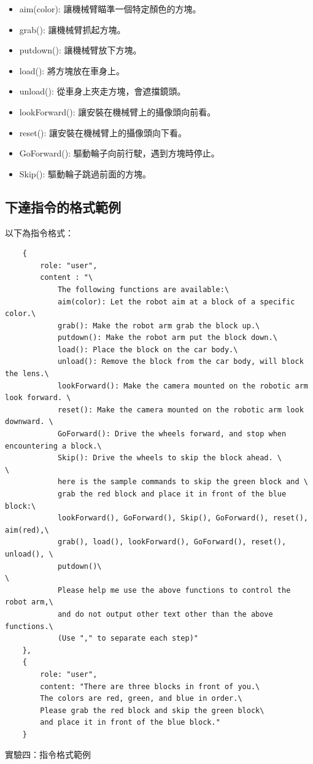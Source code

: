\documentclass[class=NCU_thesis, crop=false]{standalone}
\begin{document}
\begin{itemize}
    \item aim(color): 讓機械臂瞄準一個特定顏色的方塊。
    \item grab(): 讓機械臂抓起方塊。
    \item putdown(): 讓機械臂放下方塊。
    \item load(): 將方塊放在車身上。
    \item unload(): 從車身上夾走方塊，會遮擋鏡頭。
    \item lookForward(): 讓安裝在機械臂上的攝像頭向前看。
    \item reset(): 讓安裝在機械臂上的攝像頭向下看。

    \item GoForward(): 驅動輪子向前行駛，遇到方塊時停止。
    \item Skip(): 驅動輪子跳過前面的方塊。 
\end{itemize}

\newpage
\subsection{下達指令的格式範例}
以下為指令格式：
\begin{listing}[h]
    \begin{verbatim}
    {     
        role: "user",
        content : "\
            The following functions are available:\
            aim(color): Let the robot aim at a block of a specific color.\
            grab(): Make the robot arm grab the block up.\
            putdown(): Make the robot arm put the block down.\
            load(): Place the block on the car body.\
            unload(): Remove the block from the car body, will block the lens.\
            lookForward(): Make the camera mounted on the robotic arm look forward. \
            reset(): Make the camera mounted on the robotic arm look downward. \
            GoForward(): Drive the wheels forward, and stop when encountering a block.\
            Skip(): Drive the wheels to skip the block ahead. \
\
            here is the sample commands to skip the green block and \
            grab the red block and place it in front of the blue block:\
            lookForward(), GoForward(), Skip(), GoForward(), reset(), aim(red),\
            grab(), load(), lookForward(), GoForward(), reset(), unload(), \
            putdown()\
\
            Please help me use the above functions to control the robot arm,\
            and do not output other text other than the above functions.\
            (Use "," to separate each step)"
    },
    {
        role: "user", 
        content: "There are three blocks in front of you.\
        The colors are red, green, and blue in order.\
        Please grab the red block and skip the green block\
        and place it in front of the blue block."
    }
    \end{verbatim}
\caption{實驗四：指令格式範例} 
\end{listing}
\end{document}
